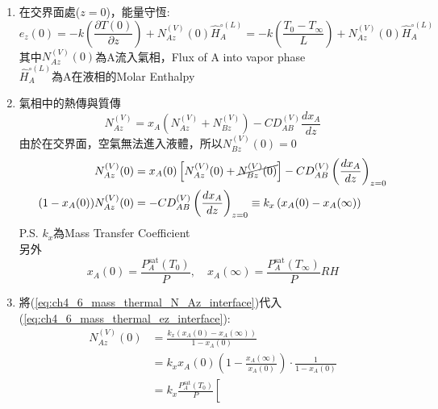 \documentclass[../main.tex]{subfiles}
\begin{document}
\begin{itemize}
\begin{enumerate}
\begin{align}
    \end{align}
    解得:
    \begin{equation}
      T(z) = \left(\frac{T_0 - T_\infty}{L}\right) z + T_0
    \end{equation}
    \item 在交界面處($z=0$)，能量守恆:
    \begin{equation}
      e_z(0) = -k\left(
        \frac{\partial T(0)}{\partial z}
      \right) + N_{Az}^{(V)}(0)\hat H_A^{\circ (L)}
      = -k\left(
        \frac{T_0-T_\infty}{L}
      \right) + N_{Az}^{(V)}(0)\hat H_A^{\circ (L)} \label{eq:ch4_6_mass_thermal_ez_interface}
    \end{equation}
    其中$N_{Az}^{(V)}(0)$為A流入氣相，Flux of A into vapor phase\\
    $\hat H_A^{\circ (L)}$為A在液相的Molar Enthalpy
    \item 氣相中的熱傳與質傳
    \begin{equation}
      N_{Az}^{(V)} = x_A\left(
        N_{Az}^{(V)} + N_{Bz}^{(V)}
      \right)-C D_{AB}^{(V)}\frac{dx_A}{dz}
    \end{equation}
    由於在交界面，空氣無法進入液體，所以$N_{Bz}^{(V)}(0) = 0$
    \begin{align}
      N_{Az}^{(V)}(0) &= x_A(0)\left[
        N_{Az}^{(V)}(0) +\cancel{N_{Bz}^{(V)}(0)}
      \right] - C D_{AB}^{(V)}\left(
        \frac{dx_A}{dz}\right)_{z=0} \nonumber\\
      (1-x_A(0))N_{Az}^{(V)}(0) &= - C D_{AB}^{(V)}\left(
        \frac{dx_A}{dz}\right)_{z=0} \equiv k_x \left(
          x_A(0) - x_A(\infty)
        \right) \label{eq:ch4_6_mass_thermal_N_Az_interface}
    \end{align}
    P.S. $k_x$為Mass Transfer Coefficient\\
    另外
    \begin{equation}
      x_A(0) = \frac{P_A^{\text{sat}}(T_0)}{P}, \quad 
      x_A(\infty) = \frac{P_A^{\text{sat}}(T_\infty)}{P} RH
    \end{equation}
    \item 將(\ref{eq:ch4_6_mass_thermal_N_Az_interface})代入(\ref{eq:ch4_6_mass_thermal_ez_interface}):
    \begin{align}
      N_{Az}^{(V)}(0) &= \frac{k_x\left(
        x_A(0) - x_A(\infty)
      \right)}{1-x_A(0)} \nonumber\\
      &= k_x x_A(0) \left(
        1-\frac{x_A(\infty)}{x_A(0)}
      \right)\cdot \frac{1}{1 - x_A(0)} \nonumber\\
      &= k_x \frac{P_A^{\text{sat}}(T_0)}{P} \left[

\end{align}
\end{enumerate}
\end{itemize}
\end{document}
